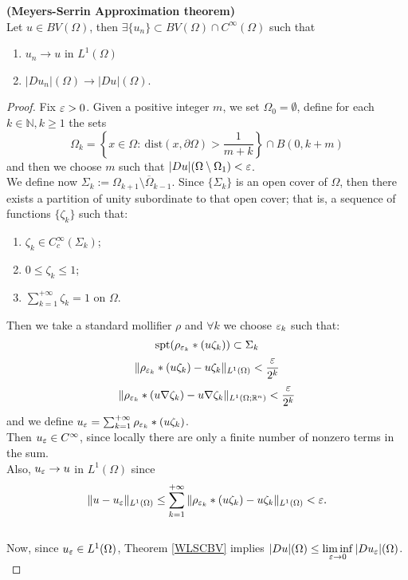 \begin{theorem} \label{Meyers-SerrinBV} {\bf (Meyers-Serrin Approximation theorem)} 
\\
Let $u \in BV(\Omega)$, then $\exists \{u_{n}\} \subset BV(\Omega) \cap C^{\infty}(\Omega)$ such that 
\begin{enumerate}
	\item $u_{n} \to u$ in $L^{1}(\Omega)$
	\item $|Du_{n}|(\Omega) \to |Du|(\Omega)$.
\end{enumerate}
\end{theorem}

\begin{proof}
Fix $\varepsilon > 0$. Given a positive integer $m$, we set $\Omega_{0} = \emptyset$, define for each $k \in \mathbb{N}, k \ge 1$ the sets
\[ \Omega_{k} = \left \{ x \in \Omega : \ \mathrm{dist}(x, \partial \Omega) > \frac{1}{m + k} \right \} \cap B(0, k + m) \]
and then we choose $m$ such that $|Du|(\Omega \setminus \Omega_{1}) < \varepsilon$. 
\\
We define now $\Sigma_{k} := \Omega_{k+1} \setminus \overline \Omega_{k-1}$. Since $\{\Sigma_{k}\}$ is an open cover of $\Omega$, then there exists a partition of unity subordinate to that open cover; that is, a sequence of functions $\{\zeta_{k}\}$ such that:
\begin{enumerate}
	\item $\zeta_{k} \in C^{\infty}_{c}(\Sigma_{k})$;
	\item $0 \le \zeta_{k} \le 1$;
	\item $\sum_{k = 1}^{+\infty} \zeta_{k} = 1$ on $\Omega$.
\end{enumerate}

Then we take a standard mollifier $\rho$ and $\forall k$  we choose $\varepsilon_{k}$ such that:
\[ \mathrm{spt}(\rho_{\varepsilon_{k}} \ast (u\zeta_{k})) \subset \Sigma_{k}\]
\[ \|\rho_{\varepsilon_{k}} \ast (u\zeta_{k}) - u\zeta_{k}\|_{L^{1}(\Omega)} < \frac{\varepsilon}{2^{k}}\]
\[ \|\rho_{\varepsilon_{k}} \ast (u\nabla\zeta_{k}) - u\nabla\zeta_{k}\|_{L^{1}(\Omega; \mathbb{R}^{n})} < \frac{\varepsilon}{2^{k}}\]
and we define $u_{\varepsilon} = \sum_{k=1}^{+\infty} \rho_{\varepsilon_{k}} \ast (u\zeta_{k})$. 
\\
Then $u_{\varepsilon} \in C^{\infty}$, since locally there are only a finite number of nonzero terms in the sum.
\\
Also, $u_{\varepsilon} \to u$ in $L^{1}(\Omega)$ since
\[ \|u - u_{\varepsilon}\|_{L^{1}(\Omega)} \le \sum_{k = 1}^{+\infty} \|\rho_{\varepsilon_{k}} \ast (u\zeta_{k}) - u\zeta_{k}\|_{L^{1}(\Omega)} < \varepsilon. \]
\\
Now, since $u_{\varepsilon} \in L^{1}(\Omega)$, Theorem \ref{WLSCBV} implies $|Du|(\Omega) \le \liminf\limits_{\varepsilon \to 0} |Du_{\varepsilon}|(\Omega)$.
\\


\end{proof}
